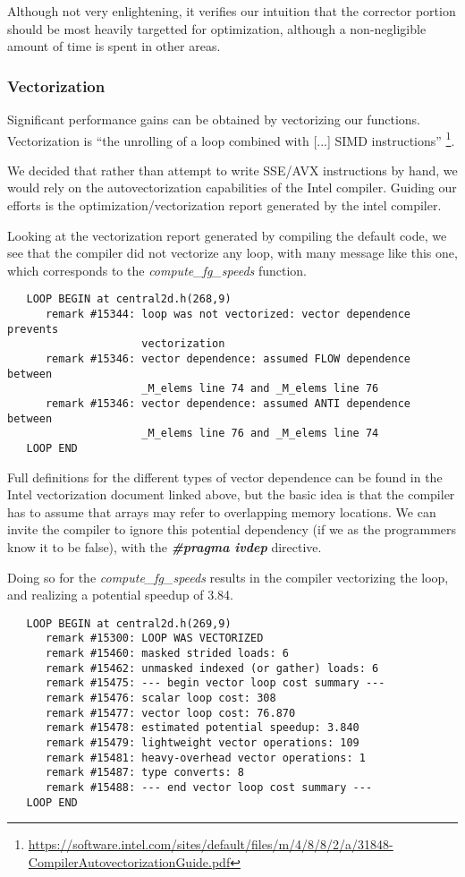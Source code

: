 Although not very enlightening, it verifies our intuition that the corrector
portion should be most heavily targetted for optimization, although a 
non-negligible amount of time is spent in other areas.

\subsubsection{Vectorization}
\label{sec-profile-vectorization}
Significant performance gains can be obtained by vectorizing our functions.
Vectorization is ``the unrolling of a loop combined with [...] SIMD instructions''
\footnote{\url{https://software.intel.com/sites/default/files/m/4/8/8/2/a/31848-CompilerAutovectorizationGuide.pdf}}.

We decided that rather than attempt to write SSE/AVX instructions by hand, we 
would rely on the autovectorization capabilities of the Intel compiler.
Guiding our efforts is the optimization/vectorization report generated by the intel
compiler.

Looking at the vectorization report generated by compiling the default code, we see
that the compiler did not vectorize any loop, with many message like this one, which
corresponds to the \emph{compute\_fg\_speeds} function.

\begin{lstlisting}
   LOOP BEGIN at central2d.h(268,9)
      remark #15344: loop was not vectorized: vector dependence prevents 
                     vectorization
      remark #15346: vector dependence: assumed FLOW dependence between 
                     _M_elems line 74 and _M_elems line 76
      remark #15346: vector dependence: assumed ANTI dependence between 
                     _M_elems line 76 and _M_elems line 74
   LOOP END
\end{lstlisting}

Full definitions for the different types of vector dependence can be found in the 
Intel vectorization document linked above,
but the basic idea is that the compiler has to assume that arrays may refer to
overlapping memory locations.  We can invite the compiler to ignore this potential
dependency (if we as the programmers know it to be false), with the
\textbf{\emph{\#pragma ivdep}} directive.

Doing so for the \emph{compute\_fg\_speeds} results in the compiler
vectorizing the loop, and realizing a potential speedup of 3.84.

\begin{lstlisting}
   LOOP BEGIN at central2d.h(269,9)
      remark #15300: LOOP WAS VECTORIZED
      remark #15460: masked strided loads: 6 
      remark #15462: unmasked indexed (or gather) loads: 6 
      remark #15475: --- begin vector loop cost summary ---
      remark #15476: scalar loop cost: 308 
      remark #15477: vector loop cost: 76.870 
      remark #15478: estimated potential speedup: 3.840 
      remark #15479: lightweight vector operations: 109 
      remark #15481: heavy-overhead vector operations: 1 
      remark #15487: type converts: 8 
      remark #15488: --- end vector loop cost summary ---
   LOOP END
\end{lstlisting}

